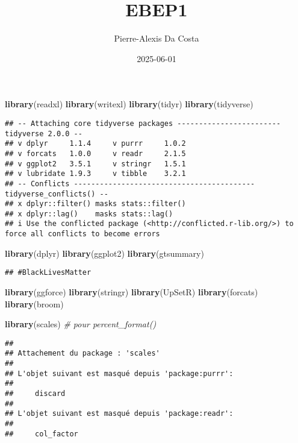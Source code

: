 \documentclass[
]{article}
\title{EBEP1}
\author{Pierre-Alexis Da Costa}
\date{2025-06-01}
\newenvironment{Shaded}{\begin{snugshade}}{\end{snugshade}}
\newcommand{\CommentTok}[1]{\textcolor[rgb]{0.56,0.35,0.01}{\textit{#1}}}
\newcommand{\FunctionTok}[1]{\textcolor[rgb]{0.13,0.29,0.53}{\textbf{#1}}}
\newcommand{\NormalTok}[1]{#1}
\begin{document}
\maketitle

\begin{Shaded}
\begin{Highlighting}[]
\FunctionTok{library}\NormalTok{(readxl)}
\FunctionTok{library}\NormalTok{(writexl)}
\FunctionTok{library}\NormalTok{(tidyr)}
\FunctionTok{library}\NormalTok{(tidyverse)}
\end{Highlighting}
\end{Shaded}

\begin{verbatim}
## -- Attaching core tidyverse packages ------------------------ tidyverse 2.0.0 --
## v dplyr     1.1.4     v purrr     1.0.2
## v forcats   1.0.0     v readr     2.1.5
## v ggplot2   3.5.1     v stringr   1.5.1
## v lubridate 1.9.3     v tibble    3.2.1
## -- Conflicts ------------------------------------------ tidyverse_conflicts() --
## x dplyr::filter() masks stats::filter()
## x dplyr::lag()    masks stats::lag()
## i Use the conflicted package (<http://conflicted.r-lib.org/>) to force all conflicts to become errors
\end{verbatim}

\begin{Shaded}
\begin{Highlighting}[]
\FunctionTok{library}\NormalTok{(dplyr)}
\FunctionTok{library}\NormalTok{(ggplot2)}
\FunctionTok{library}\NormalTok{(gtsummary)}
\end{Highlighting}
\end{Shaded}

\begin{verbatim}
## #BlackLivesMatter
\end{verbatim}

\begin{Shaded}
\begin{Highlighting}[]
\FunctionTok{library}\NormalTok{(ggforce)}
\FunctionTok{library}\NormalTok{(stringr)}
\FunctionTok{library}\NormalTok{(UpSetR)}
\FunctionTok{library}\NormalTok{(forcats)}
\FunctionTok{library}\NormalTok{(broom)}

\FunctionTok{library}\NormalTok{(scales)  }\CommentTok{\# pour percent\_format()}
\end{Highlighting}
\end{Shaded}

\begin{verbatim}
## 
## Attachement du package : 'scales'
## 
## L'objet suivant est masqué depuis 'package:purrr':
## 
##     discard
## 
## L'objet suivant est masqué depuis 'package:readr':
## 
##     col_factor
\end{verbatim}
\end{document}
